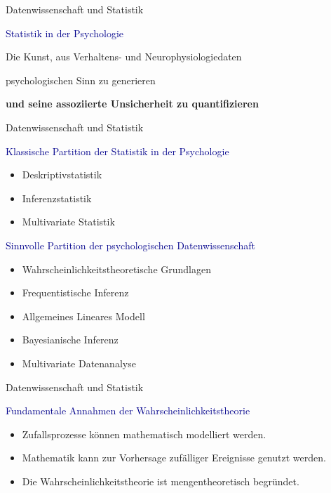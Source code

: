 \documentclass[
  8pt,
  ignorenonframetext,
]{beamer}
\providecommand{\tightlist}{%
  \setlength{\itemsep}{0pt}\setlength{\parskip}{0pt}}
\begin{document}
\begin{frame}{Datenwissenschaft und Statistik}
\protect\hypertarget{datenwissenschaft-und-statistik-10}{}
\center
\huge

\textcolor{darkblue}{Statistik in der Psychologie}

\vspace{5mm}
\Large

Die Kunst, aus Verhaltens- und Neurophysiologiedaten

psychologischen Sinn zu generieren

\textbf{und seine assoziierte Unsicherheit zu quantifizieren}
\end{frame}

\begin{frame}{Datenwissenschaft und Statistik}
\protect\hypertarget{datenwissenschaft-und-statistik-11}{}
\vfill
{}

\textcolor{darkblue}{Klassische Partition der Statistik in der Psychologie}

\begin{itemize}
\tightlist
\item
  Deskriptivstatistik
\item
  Inferenzstatistik
\item
  Multivariate Statistik
\end{itemize}

\textcolor{darkblue}{Sinnvolle Partition der psychologischen Datenwissenschaft}

\begin{itemize}
\tightlist
\item
  Wahrscheinlichkeitstheoretische Grundlagen
\item
  Frequentistische Inferenz
\item
  Allgemeines Lineares Modell
\item
  Bayesianische Inferenz
\item
  Multivariate Datenanalyse
\end{itemize}

\vfill
\end{frame}

\begin{frame}{Datenwissenschaft und Statistik}
\protect\hypertarget{datenwissenschaft-und-statistik-12}{}
\vfill
{}

\textcolor{darkblue}{Fundamentale Annahmen der Wahrscheinlichkeitstheorie}
\vspace{1mm}

\begin{itemize}
\tightlist
\item
  \justifying  Zufallsprozesse können mathematisch modelliert werden.
\item
  Mathematik kann zur Vorhersage zufälliger Ereignisse genutzt werden.
\item
  Die Wahrscheinlichkeitstheorie ist mengentheoretisch begründet.
\end{itemize}
\end{frame}
\end{document}
